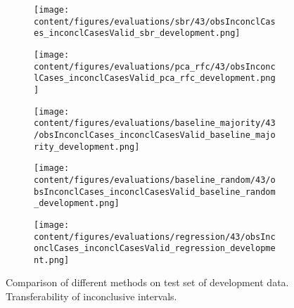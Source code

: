 \begin{figure}[ht]
  \begin{subfigure}{0.5\textwidth}
    \centering
    \texttt{[image: content/figures/evaluations/sbr/43/obsInconclCases\_inconclCasesValid\_sbr\_development.png]}
  \end{subfigure}
  \hfill
  \begin{subfigure}{0.5\textwidth}
    \centering
    \texttt{[image: content/figures/evaluations/pca\_rfc/43/obsInconclCases\_inconclCasesValid\_pca\_rfc\_development.png]}
  \end{subfigure}
  \hfill
  \begin{subfigure}{0.5\textwidth}
    \centering
    \texttt{[image: content/figures/evaluations/baseline\_majority/43/obsInconclCases\_inconclCasesValid\_baseline\_majority\_development.png]}
  \end{subfigure}
  \hfill
  \begin{subfigure}{0.5\textwidth}
    \centering
    \texttt{[image: content/figures/evaluations/baseline\_random/43/obsInconclCases\_inconclCasesValid\_baseline\_random\_development.png]}
  \end{subfigure}
  \hfill
  \begin{subfigure}{0.5\textwidth}
    \centering
    \texttt{[image: content/figures/evaluations/regression/43/obsInconclCases\_inconclCasesValid\_regression\_development.png]}
  \end{subfigure}

  \caption{Comparison of different methods on test set of development data. Transferability of inconclusive intervals.}
  \label{fig:test_interval_match_dev}
\end{figure}


